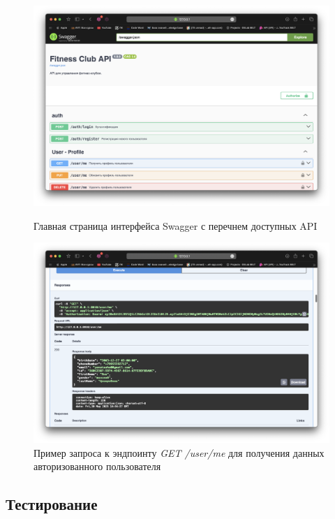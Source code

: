 \begin{figure}[ht!]
	\centering
	\includegraphics[scale=0.32]{./img/sw1.png}
	\caption{Главная страница интерфейса Swagger с перечнем доступных API}
	\label{fig:swagger_interface_1}
	
	\vspace{1em} %
	
	\includegraphics[scale=0.32]{./img/sw2.png}
	\caption{Пример запроса к эндпоинту \textit{GET /user/me} для получения данных авторизованного пользователя}
	\label{fig:swagger_interface_2}
\end{figure}


\subsection{Тестирование}

